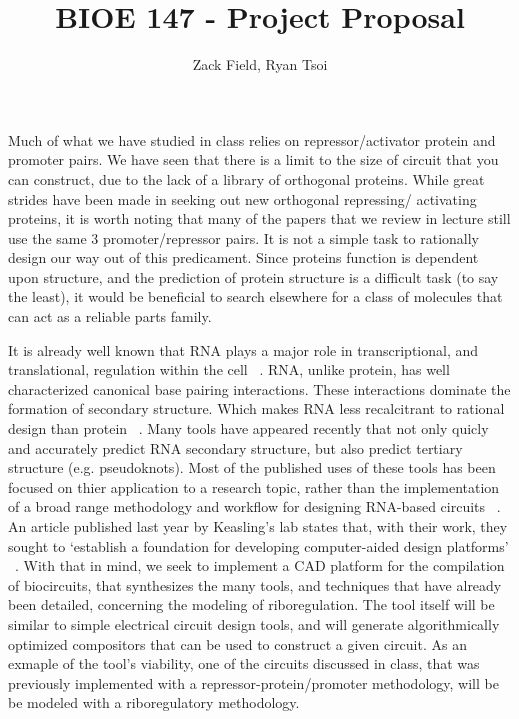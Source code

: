 \documentclass[11pt]{article}
\title{BIOE 147 - Project Proposal}
\author{Zack Field, Ryan Tsoi}
\date{}
\begin{document}
\maketitle

 
 Much of what we have studied in class relies on repressor/activator protein
 and promoter pairs. We have seen that there is a limit to the size of circuit 
 that you can construct, due to the lack of a library of orthogonal proteins.
 While great strides have been made in seeking out new orthogonal repressing/
 activating proteins, it is worth noting that many of the papers that we
 review in lecture still use the same 3 promoter/repressor pairs. 
 It is not a simple task to rationally design our way out of this predicament.
 Since proteins function is dependent upon structure, and the prediction of 
 protein structure is a difficult task (to say the least),
 it would be beneficial to search elsewhere 
 for a class of molecules that can act as a reliable parts family. 

 It is already well known that RNA 
 plays a major role in transcriptional, and translational, regulation within 
 the cell  ~\cite{review}. RNA, unlike protein, has well characterized canonical base pairing 
 interactions.  These interactions dominate the formation of secondary structure. 
 Which makes RNA less recalcitrant to rational design than protein ~\cite{howfolds}. Many tools
 have appeared recently that not only quicly and accurately predict RNA secondary structure,
 but also predict tertiary structure (e.g. pseudoknots). Most of the published uses of
 these tools has been focused on thier application to a research topic, rather than
 the implementation of a broad range methodology and workflow for designing 
 RNA-based circuits ~\cite{genetic_switchboard}. An article published last year
 by Keasling's lab states that, with their work, they sought to `establish a foundation for 
 developing computer-aided design platforms' ~\cite{Keasling_Model-Driven}.
 With that in mind, we seek to implement a CAD platform for the compilation of
 biocircuits, that synthesizes the many tools, and techniques that have already
 been detailed, concerning the modeling of riboregulation. The tool itself will
 be similar to simple electrical circuit design tools, and will generate
 algorithmically optimized compositors that can be used to construct a given circuit.
 As an exmaple of the tool's viability, one of the circuits discussed in class, that
 was previously implemented with a repressor-protein/promoter methodology, will be 
 be modeled with a riboregulatory methodology.
\end{document}
